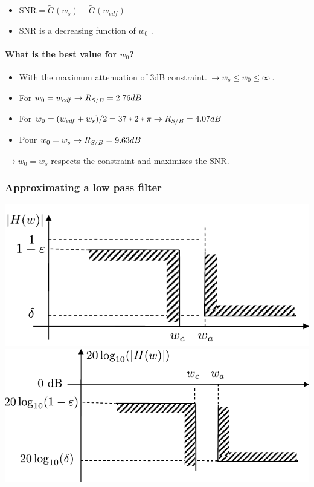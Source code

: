 \begin{itemize}
  \item SNR$=\tilde G(w_s)-\tilde G(w_{edf})$
  \item SNR is a decreasing function of $w_0$ .
  \end{itemize}     

  \paragraph{What is the best value for $w_0$?}
  
  \begin{itemize}
    \item With the maximum attenuation of 3dB constraint.
      $\rightarrow  w_s\leq w_0 \leq \infty$.
    \item For $w_0=w_{edf}\rightarrow R_{S/B}= {2.76 dB}$ 
    \item For $w_0=(w_{edf}+w_s)/2={37*2*\pi}\rightarrow
      R_{S/B}= {4.07dB}$
    \item Pour $w_0=w_{s}\rightarrow R_{S/B}= {9.63dB}$ 
    \end{itemize}
     $\rightarrow w_0=w_s$ respects the constraint and maximizes the SNR.


     \frametitle{Approximating a low pass filter }

     \begin{center}
       \includegraphics[width=.45\columnwidth]{imgs/fourier/gabarit1}
    \includegraphics[width=.45\columnwidth]{imgs/fourier/gabarit2}
     \end{center}
   
